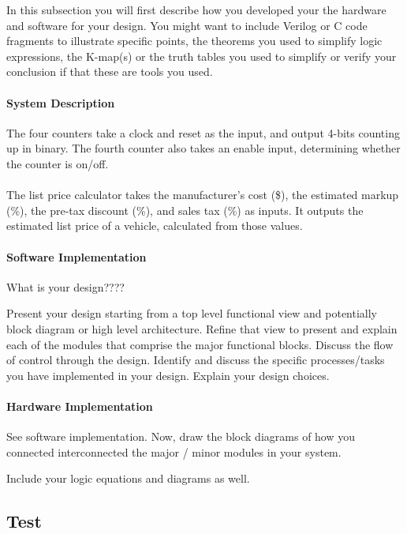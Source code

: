 \documentclass{article}
\begin{document}
  In this subsection you will first describe how you developed your the hardware and software for your design. You might want to include Verilog or C code fragments to illustrate specific points, the theorems you used to simplify logic expressions, the K-map(s) or the truth tables you used to simplify or verify your conclusion if that these are tools you used. 

  \paragraph{System Description} The four counters take a clock and reset as the input, and output 4-bits counting up in binary. The fourth counter also takes an enable input, determining whether the counter is on/off.

  \paragraph{} The list price calculator takes the manufacturer's cost (\$), the estimated markup (\%), the pre-tax discount (\%), and sales tax (\%) as inputs. It outputs the estimated list price of a vehicle, calculated from those values.
  
  \paragraph{Software Implementation} 

  What is your design????

Present your design starting from a top level functional view and potentially block diagram or high level architecture.  Refine that view to present and explain each of the modules that comprise the major functional blocks.  Discuss the flow of control through the design.  Identify and discuss the specific processes/tasks you have implemented in your design. Explain your design choices. 

  \paragraph{Hardware Implementation}

  See software implementation.  Now, draw the block diagrams of how you connected interconnected the major / minor modules in your system.

Include your logic equations and diagrams as well.

  \subsection{Test}
\end{document}
